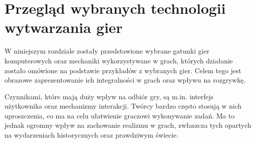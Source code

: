 \chapter{Przegląd wybranych technologii wytwarzania gier}

W niniejszym rozdziale zostały przedstawione wybrane gatunki gier komputerowych oraz mechaniki wykorzystywane w grach,
których działanie zostało omówione na podstawie przykładów z wybranych gier. Celem tego jest obrazowe zaprezentowanie
ich integralności w grach oraz wpływu na rozgrywkę.

Czynnikami, które mają duży wpływ na odbiór gry, są m.in. interfejs użytkownika oraz mechanizmy interakcji. Twórcy bardzo
często stosują w nich uproszczenia, co ma na celu
ułatwienie graczowi wykonywanie zadań. Ma to jednak ogromny wpływ na zachowanie realizmu w grach, zwłaszcza tych opartych
na wydarzeniach historycznych oraz prawdziwym świecie.













